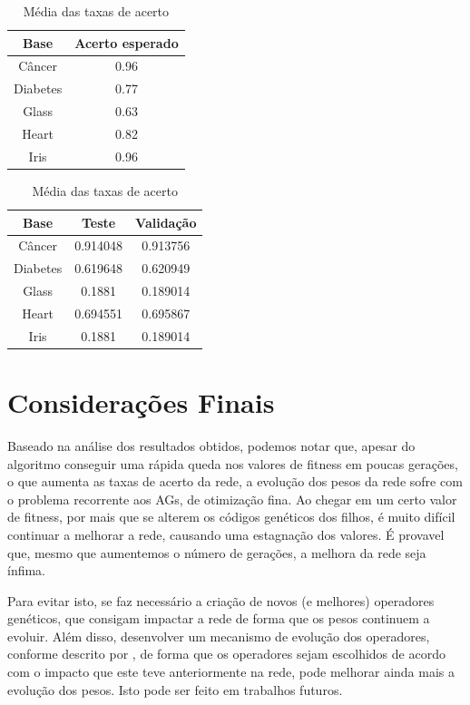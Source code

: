 \documentclass[12pt]{article}
\begin{document}
\begin{table}[ht]
\begin{minipage}[b]{0.5\linewidth}\centering
\begin{tabular}{|c|c|}
\hline
Base & Acerto esperado \\ \hline
Câncer & 0.96 \\ \hline
Diabetes & 0.77 \\ \hline
Glass & 0.63 \\ \hline
Heart & 0.82 \\ \hline
Iris & 0.96 \\ \hline
\end{tabular}
\caption{Taxas de acerto esperado}
\label{tab:hitaim}
\end{minipage}
\hspace{0.3cm}
\begin{minipage}[b]{0.5\linewidth}
\centering
\begin{tabular}{|c|c|c|}
\hline 
Base & Teste & Validação \\ \hline
Câncer & 0.914048 & 0.913756 \\ \hline
Diabetes & 0.619648 & 0.620949 \\ \hline
Glass & 0.1881 & 0.189014 \\ \hline
Heart & 0.694551 & 0.695867 \\ \hline
Iris & 0.1881 & 0.189014 \\ \hline
\end{tabular}
\caption{Média das taxas de acerto}
\label{tab:hitmed}
\end{minipage}
\end{table}

\section{Considerações Finais}

Baseado na análise dos resultados obtidos, podemos notar que, apesar do algoritmo conseguir uma rápida queda nos valores de fitness em poucas gerações, o que aumenta as taxas de acerto da rede, a evolução dos pesos da rede sofre com o problema recorrente aos AGs, de otimização fina. Ao chegar em um certo valor de fitness, por mais que se alterem os códigos genéticos dos filhos, é muito difícil continuar a melhorar a rede, causando uma estagnação dos valores. É provavel que, mesmo que aumentemos o número de gerações, a melhora da rede seja ínfima.

Para evitar isto, se faz necessário a criação de novos (e melhores) operadores genéticos, que consigam impactar a rede de forma que os pesos continuem a evoluir. Além disso, desenvolver um mecanismo de evolução dos operadores, conforme descrito por \cite{montana}, de forma que os operadores sejam escolhidos de acordo com o impacto que este teve anteriormente na rede, pode melhorar ainda mais a evolução dos pesos. Isto pode ser feito em trabalhos futuros.



\end{document}
